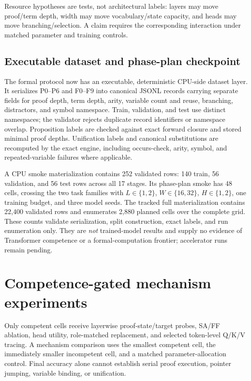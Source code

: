 \documentclass[10pt]{article}
\begin{document}
Resource hypotheses are tests, not architectural labels: layers may move proof/term depth, width may move vocabulary/state capacity, and heads may move branching/selection. A claim requires the corresponding interaction under matched parameter and training controls.

\subsection{Executable dataset and phase-plan checkpoint}
The formal protocol now has an executable, deterministic CPU-side dataset layer. It serializes P0--P6 and F0--F9 into canonical JSONL records carrying separate fields for proof depth, term depth, arity, variable count and reuse, branching, distractors, and symbol namespace. Train, validation, and test use distinct namespaces; the validator rejects duplicate record identifiers or namespace overlap. Proposition labels are checked against exact forward closure and stored minimal proof depths. Unification labels and canonical substitutions are recomputed by the exact engine, including occurs-check, arity, symbol, and repeated-variable failures where applicable.

A CPU smoke materialization contains 252 validated rows: 140 train, 56 validation, and 56 test rows across all 17 stages. Its phase-plan smoke has 48 cells, crossing the two task families with $L\in\{1,2\}$, $W\in\{16,32\}$, $H\in\{1,2\}$, one training budget, and three model seeds. The tracked full materialization contains 22,400 validated rows and enumerates 2,880 planned cells over the complete grid. These counts validate serialization, split construction, exact labels, and run enumeration only. They are \emph{not} trained-model results and supply no evidence of Transformer competence or a formal-computation frontier; accelerator runs remain pending.

\section{Competence-gated mechanism experiments}
Only competent cells receive layerwise proof-state/target probes, SA/FF ablation, head utility, role-matched replacement, and selected token-level Q/K/V tracing. A mechanism comparison uses the smallest competent cell, the immediately smaller incompetent cell, and a matched parameter-allocation control. Final accuracy alone cannot establish serial proof execution, pointer jumping, variable binding, or unification.
\end{document}
